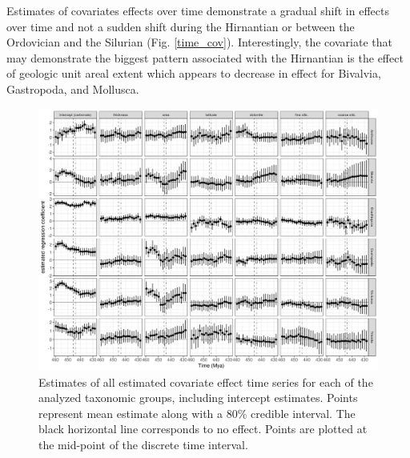 \documentclass[12pt,letterpaper]{article}
\begin{document}
Estimates of covariates effects over time demonstrate a gradual shift in effects over time and not a sudden shift during the Hirnantian or between the Ordovician and the Silurian (Fig. \ref{time_cov}). Interestingly, the covariate that may demonstrate the biggest pattern associated with the Hirnantian is the effect of geologic unit areal extent which appears to decrease in effect for Bivalvia, Gastropoda, and Mollusca. 
\begin{figure}[ht]
  \centering
  \includegraphics[width=\textwidth,height=0.5\textheight,keepaspectratio=true]{figure/cov_time_diversity}
  \caption{Estimates of all estimated covariate effect time series for each of the analyzed taxonomic groups, including intercept estimates. Points represent mean estimate along with a 80\% credible interval. The black horizontal line corresponds to no effect. Points are plotted at the mid-point of the discrete time interval.}
  \label{fig:time_cov}
\end{figure}
\end{document}
